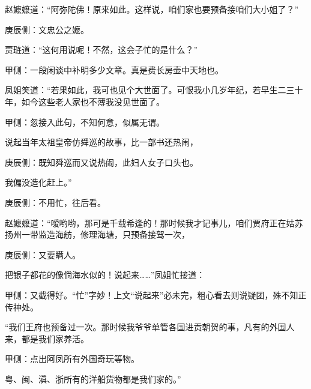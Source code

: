 \begin{parag}
    赵嬷嬷道：“阿弥陀佛！原来如此。这样说，咱们家也要预备接咱们大小姐了？”\begin{note}庚辰侧：文忠公之嬷。\end{note}贾琏道：“这何用说呢！不然，这会子忙的是什么？”\begin{note}甲侧：一段闲谈中补明多少文章。真是费长房壶中天地也。\end{note}凤姐笑道：“若果如此，我可也见个大世面了。可恨我小几岁年纪，若早生二三十年，如今这些老人家也不薄我没见世面了。\begin{note}甲侧：忽接入此句，不知何意，似属无谓。\end{note}说起当年太祖皇帝仿舜巡的故事，比一部书还热闹，\begin{note}庚辰侧：既知舜巡而又说热闹，此妇人女子口头也。\end{note}我偏没造化赶上。”\begin{note}庚辰侧：不用忙，往后看。\end{note}赵嬷嬷道：“嗳哟哟，那可是千载希逢的！那时候我才记事儿，咱们贾府正在姑苏扬州一带监造海舫，修理海塘，只预备接驾一次，\begin{note}庚辰侧：又要瞒人。\end{note}把银子都花的像倘海水似的！说起来……”凤姐忙接道：\begin{note}甲侧：又截得好。“忙”字妙！上文“说起来”必未完，粗心看去则说疑团，殊不知正传神处。\end{note}“我们王府也预备过一次。那时候我爷爷单管各国进贡朝贺的事，凡有的外国人来，都是我们家养活。\begin{note}甲侧：点出阿凤所有外国奇玩等物。\end{note}粤、闽、滇、浙所有的洋船货物都是我们家的。”
\end{parag}


